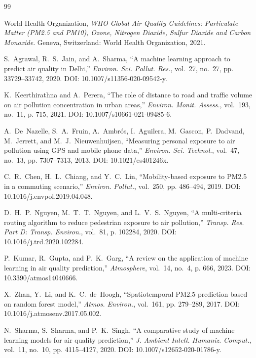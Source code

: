 \documentclass[journal]{IEEEtran}
\begin{document}
\begin{thebibliography}{99}

World Health Organization, \emph{WHO Global Air Quality Guidelines: Particulate Matter (PM2.5 and PM10), Ozone, Nitrogen Dioxide, Sulfur Dioxide and Carbon Monoxide}. Geneva, Switzerland: World Health Organization, 2021.

S.~Agrawal, R.~S.~Jain, and A.~Sharma, ``A machine learning approach to predict air quality in Delhi,'' \emph{Environ. Sci. Pollut. Res.}, vol.~27, no.~27, pp. 33729--33742, 2020. DOI: 10.1007/s11356-020-09542-y.

K.~Keerthirathna and A.~Perera, ``The role of distance to road and traffic volume on air pollution concentration in urban areas,'' \emph{Environ. Monit. Assess.}, vol.~193, no.~11, p. 715, 2021. DOI: 10.1007/s10661-021-09485-6.

A.~De~Nazelle, S.~A.~Fruin, A.~Ambr\'os, I.~Aguilera, M.~Gascon, P.~Dadvand, M.~Jerrett, and M.~J.~Nieuwenhuijsen, ``Measuring personal exposure to air pollution using GPS and mobile phone data,'' \emph{Environ. Sci. Technol.}, vol.~47, no.~13, pp. 7307--7313, 2013. DOI: 10.1021/es401246x.

C.~R.~Chen, H.~L.~Chiang, and Y.~C.~Lin, ``Mobility-based exposure to PM2.5 in a commuting scenario,'' \emph{Environ. Pollut.}, vol.~250, pp. 486--494, 2019. DOI: 10.1016/j.envpol.2019.04.048.

D.~H.~P.~Nguyen, M.~T.~T.~Nguyen, and L.~V.~S.~Nguyen, ``A multi-criteria routing algorithm to reduce pedestrian exposure to air pollution,'' \emph{Transp. Res. Part D: Transp. Environ.}, vol.~81, p. 102284, 2020. DOI: 10.1016/j.trd.2020.102284.

P.~Kumar, R.~Gupta, and P.~K.~Garg, ``A review on the application of machine learning in air quality prediction,'' \emph{Atmosphere}, vol.~14, no.~4, p. 666, 2023. DOI: 10.3390/atmos14040666.

X.~Zhan, Y.~Li, and K.~C.~de~Hoogh, ``Spatiotemporal PM2.5 prediction based on random forest model,'' \emph{Atmos. Environ.}, vol.~161, pp. 279--289, 2017. DOI: 10.1016/j.atmosenv.2017.05.002.

N.~Sharma, S.~Sharma, and P.~K.~Singh, ``A comparative study of machine learning models for air quality prediction,'' \emph{J. Ambient Intell. Humaniz. Comput.}, vol.~11, no.~10, pp. 4115--4127, 2020. DOI: 10.1007/s12652-020-01786-y.


\end{thebibliography}
\end{document}
